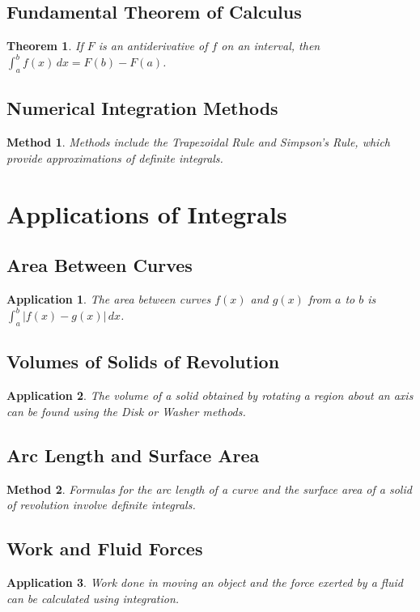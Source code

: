 \documentclass[a4paper,12pt]{book}
\newtheorem{theorem}{Theorem}
\newtheorem{application}{Application}
\newtheorem{method}{Method}
\begin{document}
\subsection{Fundamental Theorem of Calculus}
\begin{theorem}
If \( F \) is an antiderivative of \( f \) on an interval, then \( \int_a^b f(x) \, dx = F(b) - F(a) \).
\end{theorem}

\subsection{Numerical Integration Methods}
\begin{method}
Methods include the Trapezoidal Rule and Simpson's Rule, which provide approximations of definite integrals.
\end{method}

\section{Applications of Integrals}
\subsection{Area Between Curves}
\begin{application}
The area between curves \( f(x) \) and \( g(x) \) from \( a \) to \( b \) is \( \int_a^b |f(x) - g(x)| \, dx \).
\end{application}

\subsection{Volumes of Solids of Revolution}
\begin{application}
The volume of a solid obtained by rotating a region about an axis can be found using the Disk or Washer methods.
\end{application}

\subsection{Arc Length and Surface Area}
\begin{method}
Formulas for the arc length of a curve and the surface area of a solid of revolution involve definite integrals.
\end{method}

\subsection{Work and Fluid Forces}
\begin{application}
Work done in moving an object and the force exerted by a fluid can be calculated using integration.
\end{application}
\end{document}
